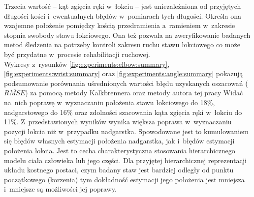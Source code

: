  
Trzecia wartość -- kąt zgięcia ręki w~łokciu -- jest uniezależniona od przyjętych długości kości i~ewentualnych błędów w~pomiarach tych długości. Określa ona wzajemne położenie pomiędzy kością przedramienia a~ramieniem w~zakresie stopnia swobody stawu łokciowego. 
Ona też pozwala na zweryfikowanie badanych metod śledzenia 
na potrzeby kontroli zakresu ruchu stawu łokciowego co może być przydatne w~procesie rehabilitacji ruchowej. \\ 

Wykresy z~rysunków \ref{fig:experiments:elbow:summary}, \ref{fig:experiments:wrist:summary} oraz \ref{fig:experiments:angle:summary} pokazują podsumowanie porównania uśrednionych wartości błędu uzyskanych oszacowań ($\overline{RMSE}$)
za pomocą metody Kalkbrennera oraz metody autora tej pracy 
Widać na~nich poprawę w~wyznaczaniu położenia stawu łokciowego do 18\%, nadgarstowego do 16\% oraz zdolności szacowania kąta zgięcia ręki w~łokciu do 11\%. Z~przedstawionych wyników wynika większa poprawa w~wyznaczaniu pozycji łokcia niż w~przypadku nadgarstka. Spowodowane jest to kumulowaniem się błędów własnych estymacji położenia nadgarstka, jak i~błędów estymacji położenia łokcia. Jest to cecha charakterystyczna stosowania hierarchicznego modelu ciała człowieka lub jego części. Dla przyjętej hierarchicznej reprezentacji układu kostnego postaci, czym badany staw jest bardziej odległy od punktu początkowego (korzenia) tym dokładność estymacji jego położenia jest mniejsza i~mniejsze są możliwości jej poprawy.\\

